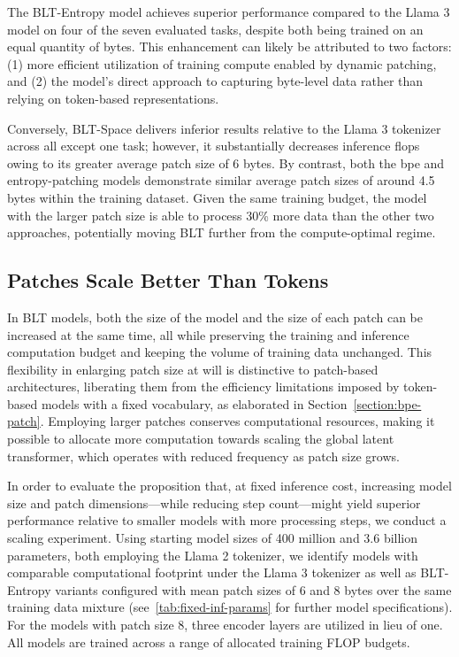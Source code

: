 The {\textsc BLT}-Entropy model achieves superior performance compared to the Llama 3 model on four of the seven evaluated tasks, despite both being trained on an equal quantity of bytes. This enhancement can likely be attributed to two factors: (1) more efficient utilization of training compute enabled by dynamic patching, and (2) the model’s direct approach to capturing byte-level data rather than relying on token-based representations.

Conversely, {\textsc BLT}-Space delivers inferior results relative to the Llama 3 tokenizer across all except one task; however, it substantially decreases inference flops owing to its greater average patch size of 6 bytes. By contrast, both the bpe and entropy-patching models demonstrate similar average patch sizes of around 4.5 bytes within the training dataset. Given the same training budget, the model with the larger patch size is able to process 30\% more data than the other two approaches, potentially moving {\textsc BLT} further from the compute-optimal regime.

\subsection{Patches Scale Better Than Tokens} In {\textsc BLT} models, both the size of the model and the size of each patch can be increased at the same time, all while preserving the training and inference computation budget and keeping the volume of training data unchanged. This flexibility in enlarging patch size at will is distinctive to patch-based architectures, liberating them from the efficiency limitations imposed by token-based models with a fixed vocabulary, as elaborated in Section~\ref{section:bpe-patch}. Employing larger patches conserves computational resources, making it possible to allocate more computation towards scaling the global latent transformer, which operates with reduced frequency as patch size grows.

In order to evaluate the proposition that, at fixed inference cost, increasing model size and patch dimensions—while reducing step count—might yield superior performance relative to smaller models with more processing steps, we conduct a scaling experiment. Using starting model sizes of 400 million and 3.6 billion parameters, both employing the Llama 2 tokenizer, we identify models with comparable computational footprint under the Llama 3 tokenizer as well as {\textsc BLT}-Entropy variants configured with mean patch sizes of 6 and 8 bytes over the same training data mixture (see~\autoref{tab:fixed-inf-params} for further model specifications). For the models with patch size 8, three encoder layers are utilized in lieu of one. All models are trained across a range of allocated training FLOP budgets.

